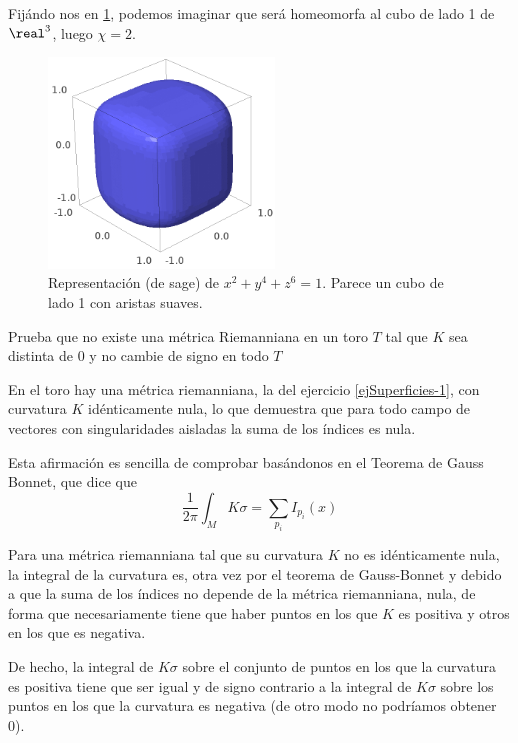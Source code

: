 \begin{problem}[1]

Fijándo nos en \ref{fig:cuboSuave}, podemos imaginar que será homeomorfa al cubo de lado 1 de $\real^3$, luego $\chi = 2$.
\begin{figure}[hbtp]
\centering
\includegraphics[width=6cm,height=5.60cm]{img/cubo_suave.png}
\caption{Representación (de sage) de $x^2+y^4+z^6=1$. Parece un cubo de lado 1 con aristas suaves.}
\label{fig:cuboSuave}
\end{figure}

\end{problem}

\begin{problem}[2]
Prueba que no existe una métrica Riemanniana en un toro $T$ tal que $K$ sea distinta de 0 y no cambie de signo en todo $T$
\solution

 

En el toro hay una métrica riemanniana, la del ejercicio \ref{ejSuperficies-1}, con curvatura $K$ idénticamente nula, lo que demuestra que para todo campo de vectores con singularidades aisladas la suma de los índices es nula.

Esta afirmación es sencilla de comprobar basándonos en el Teorema de Gauss Bonnet, que dice que
\[\frac{1}{2π}\int_M Kσ = \sum_{p_i} I_{p_i}(x)\]

Para una métrica riemanniana tal que su curvatura $K$ no es idénticamente nula, la integral de la curvatura es, otra vez por el teorema de Gauss-Bonnet y debido a que la suma de los índices no depende de la métrica riemanniana, nula, de forma que necesariamente tiene que haber puntos en los que $K$ es positiva y otros en los que es negativa.

De hecho, la integral de $Kσ$ sobre el conjunto de puntos en los que la curvatura es positiva tiene que ser igual y de signo contrario a la integral de $Kσ$ sobre los puntos en los que la curvatura es negativa (de otro modo no podríamos obtener 0).

\end{problem}

